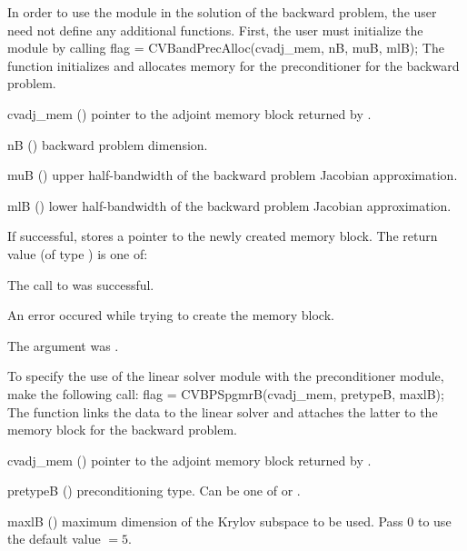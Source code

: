 In order to use the {\cvbandpre} module in the solution of the backward problem,
the user need not define any additional functions. First, the user must initialize the
{\cvbandpre} module by calling
{
  flag = CVBandPrecAlloc(cvadj\_mem, nB, muB, mlB);
}
{
  The function  initializes and allocates
  memory for the {\cvbandpre} preconditioner for the backward problem.
}
{
  \begin{args}
  \item[cvadj\_mem] ()
    pointer to the adjoint memory block returned by .
  \item[nB] ()
    backward problem dimension.
  \item[muB] ()
    upper half-bandwidth of the backward problem Jacobian approximation.
  \item[mlB] ()
    lower half-bandwidth of the backward problem Jacobian approximation.
  \end{args}
}
{
  If successful,  stores a pointer to the newly created 
  {\cvbandpre} memory block.
  The return value  (of type ) is one of:
  \begin{args}
  \item[\Id{CVBANDPRE\_SUCCESS}]
    The call to  was successful.
  \item[\Id{CVBANDPRE\_MEM\_FAIL}]
    An error occured while trying to create the {\cvbandpre} memory block.
  \item[\Id{CVBANDPRE\_ADJMEM\_NULL}]
    The  argument was .
  \end{args}
}
{}
To specify the use of the {\cvspgmr} linear solver module with the {\cvbandpre} 
preconditioner module, make the following call:
{
  flag = CVBPSpgmrB(cvadj\_mem, pretypeB, maxlB);
}
{
  The function  links the {\cvbandpre} data to the
  {\cvspgmr} linear solver and attaches the latter to the {\cvodes}
  memory block for the backward problem.
}
{
  \begin{args}
  \item[cvadj\_mem] ()
    pointer to the adjoint memory block returned by .
  \item[pretypeB] ()
    preconditioning type. Can be one of  or .
  \item[maxlB] ()
    maximum dimension of the Krylov subspace to be used. Pass $0$ to use the 
    default value $=5$.
  \end{args}
}
